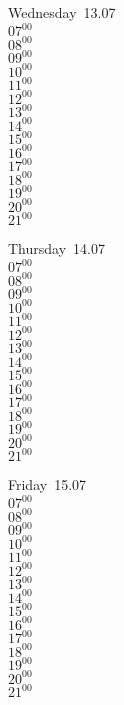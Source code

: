 \documentclass[11pt,a4paper]{book}\usepackage[]{graphicx}\usepackage[]{color}
\begin{document}
\begin{weekdaybox}
  Wednesday~13.07\\
  { 
  \vfill
  $07^{00}$\\
$08^{00}$\\
$09^{00}$\\
$10^{00}$\\
$11^{00}$\\
$12^{00}$\\
$13^{00}$\\
$14^{00}$\\
$15^{00}$\\
$16^{00}$\\
$17^{00}$\\
$18^{00}$\\
$19^{00}$\\
$20^{00}$\\
$21^{00}$\\
  }
\end{weekdaybox}
\clearpage
\begin{headerbox}
\end{headerbox}
\begin{weekdaybox}
  Thursday~14.07\\
  { 
  \vfill
  $07^{00}$\\
$08^{00}$\\
$09^{00}$\\
$10^{00}$\\
$11^{00}$\\
$12^{00}$\\
$13^{00}$\\
$14^{00}$\\
$15^{00}$\\
$16^{00}$\\
$17^{00}$\\
$18^{00}$\\
$19^{00}$\\
$20^{00}$\\
$21^{00}$\\
  }
\end{weekdaybox} 
\begin{weekdaybox}
  Friday~15.07\\
  { 
  \vfill
  $07^{00}$\\
$08^{00}$\\
$09^{00}$\\
$10^{00}$\\
$11^{00}$\\
$12^{00}$\\
$13^{00}$\\
$14^{00}$\\
$15^{00}$\\
$16^{00}$\\
$17^{00}$\\
$18^{00}$\\
$19^{00}$\\
$20^{00}$\\
$21^{00}$\\
  }
\end{weekdaybox}
\end{document}
